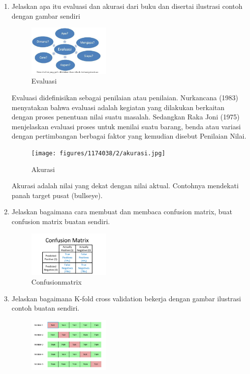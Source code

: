 \begin{enumerate}
	\item Jelaskan apa itu evaluasi dan akurasi dari buku dan disertai ilustrasi contoh dengan gambar sendiri
	\hfill\break
	\begin{figure}[H]
		\includegraphics[width=4cm]{figures/1174038/2/Evaluasi.jpg}
		\centering
		\caption{Evaluasi}
	\end{figure}
	\hfill\break
	Evaluasi didefinisikan sebagai penilaian atau penilaian. Nurkancana (1983) menyatakan bahwa evaluasi adalah kegiatan yang dilakukan berkaitan dengan proses 
	penentuan nilai suatu masalah. Sedangkan Raka Joni (1975) menjelaskan evaluasi proses untuk menilai suatu barang, benda atau variasi dengan pertimbangan berbagai 
	faktor yang kemudian disebut Penilaian Nilai.
	\begin{figure}[H]
		\texttt{[image: figures/1174038/2/akurasi.jpg]}
		\centering
		\caption{Akurasi}
	\end{figure}
	\hfill\break
	Akurasi adalah nilai yang dekat dengan nilai aktual. Contohnya mendekati panah target pusat (bullseye).
	\item Jelaskan bagaimana cara membuat dan membaca confusion matrix, buat confusion matrix buatan sendiri.
	\hfill\break
	\begin{figure}[H]
		\includegraphics[width=4cm]{figures/1174038/2/confusionmatrix.png}
		\centering
		\caption{Confusionmatrix}
	\end{figure}
	\hfill\break
	\item Jelaskan bagaimana K-fold cross validation bekerja dengan gambar ilustrasi contoh buatan sendiri.
	\hfill\break
	\begin{figure}[H]
		\includegraphics[width=4cm]{figures/1174038/2/kfold.png}

\end{figure}
\end{enumerate}
